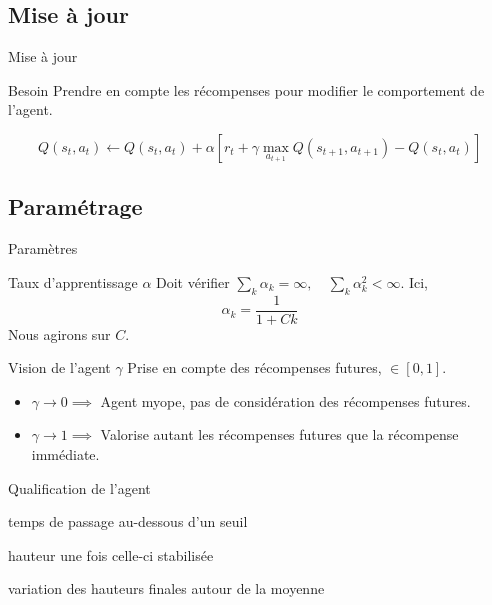 \documentclass[tikz, footheight=2em]{beamer}
\begin{document}
\subsection{Mise à jour}
\begin{frame}[c]{Mise à jour}
  \begin{block}{Besoin}
    Prendre en compte les récompenses pour modifier le comportement de l'agent.
  \end{block}
  \pause{}
  \[
    Q(s_t, a_t) \leftarrow Q(s_t,a_t) + \alpha
    [r_t + \gamma \max_{a_{t+1}} Q(s_{t+1},a_{t+1}) - Q(s_t,a_t)]
  \]
\end{frame}

\subsection{Paramétrage}
\begin{frame}[c]{Paramètres}
  \begin{block}{Taux d'apprentissage \(\alpha\)}
    Doit vérifier \(\sum_{k} \alpha_k = \infty, \quad
    \sum_k \alpha_k^2 < \infty \).
    \pause{}
    Ici, \[ \alpha_k = \frac{1}{1 + Ck} \]
    Nous agirons sur \(C\).
  \end{block}
  \pause{}
  \begin{block}{Vision de l'agent \(\gamma\)}
    Prise en compte des récompenses futures, \(\in [0,1]\).
    \pause{}
    \begin{itemize}
      \item \(\gamma \to 0 \implies\) Agent myope, pas de considération des
        récompenses futures.
      \item \(\gamma \to 1 \implies\) Valorise autant les récompenses futures
        que la récompense immédiate.
    \end{itemize}
  \end{block}
\end{frame}

\begin{frame}[c]{Qualification de l'agent}
  \begin{description}
    \item[Décroissance] temps de passage au-dessous d'un seuil
    \item[Hauteur finale] hauteur une fois celle-ci stabilisée
    \item[Stabilité] variation des hauteurs finales autour de la moyenne 
  \end{description}
  \begin{figure}[H]
  \end{figure}
\end{frame}
\end{document}
